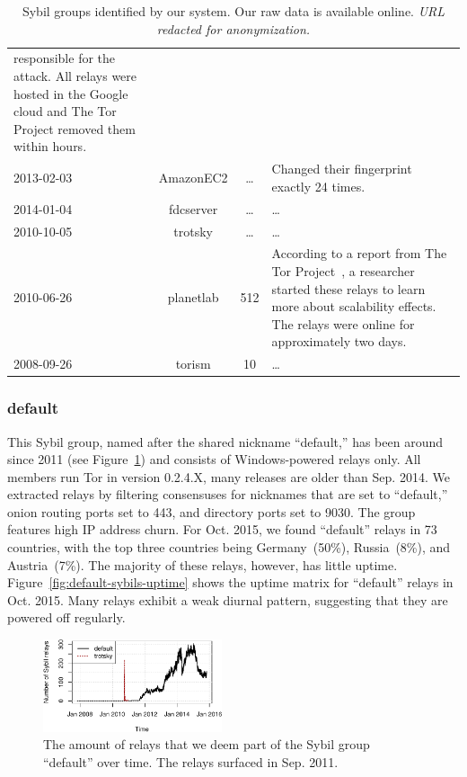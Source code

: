 \begin{table}[t]
\begin{tabular}{l c c p{10cm}}
responsible for the attack.  All relays were hosted in the Google cloud and The
Tor Project removed them within hours. \\
2013-02-03 & AmazonEC2 & \ldots & Changed their fingerprint exactly 24 times. \\
2014-01-04 & fdcserver & \ldots & \ldots \\
2010-10-05 & trotsky & \ldots & \ldots \\
2010-06-26 & planetlab & 512 & According to a report from The Tor
Project~\cite{progressreport}, a researcher started these relays to learn more
about scalability effects.  The relays were online for approximately two days. \\
2008-09-26 & torism & 10 & \ldots \\
\end{tabular}
\caption{Sybil groups identified by our system.  Our raw data is available
online. \emph{URL redacted for anonymization.}}
\label{tab:sybils}
\end{table}

\subsubsection{default}
This Sybil group, named after the shared nickname ``default,'' has been around
since 2011 (see Figure~\ref{fig:default-over-time}) and consists of
Windows-powered relays only.  All members run Tor in version 0.2.4.X, many
releases are older than Sep. 2014.  We extracted relays by filtering consensuses
for nicknames that are set to ``default,'' onion routing ports set to 443, and
directory ports set to 9030.  The group features high IP address churn.  For
Oct. 2015, we found ``default'' relays in 73 countries, with the top three
countries being Germany~(50\%), Russia~(8\%), and Austria~(7\%).  The majority
of these relays, however, has little uptime.
Figure~\ref{fig:default-sybils-uptime} shows the uptime matrix for ``default''
relays in Oct. 2015.  Many relays exhibit a weak diurnal pattern, suggesting
that they are powered off regularly.

\begin{figure}[t]
	\centering
	\includegraphics[width=0.47\textwidth]{diagrams/default-over-time}
	\caption{The amount of relays that we deem part of the Sybil group
	``default'' over time.  The relays surfaced in Sep. 2011.}
	\label{fig:default-over-time}
\end{figure}

